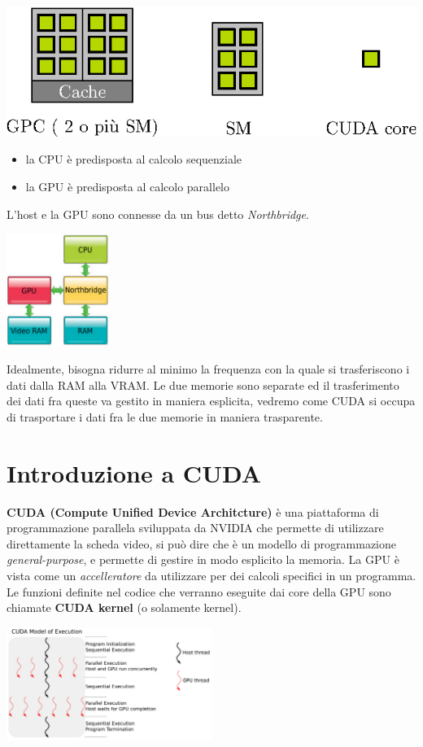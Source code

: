 \documentclass[10pt, letterpaper]{report}
\begin{document}
\begin{center}
    \includegraphics[width=\textwidth ]{images/SMblocchiCore2.eps}
\end{center}\begin{itemize}
    \item la CPU è predisposta al calcolo sequenziale 
    \item la GPU è predisposta al calcolo parallelo
\end{itemize}
L'host e la GPU sono connesse da un bus detto \textit{Northbridge}.\begin{center}
    \includegraphics[width=0.25\textwidth ]{images/GPUCPU.png}
\end{center}
Idealmente, bisogna ridurre al minimo la frequenza con la quale si trasferiscono i dati dalla RAM alla VRAM. Le due memorie sono separate ed il trasferimento dei dati fra queste va gestito in maniera esplicita, vedremo come CUDA  si occupa di trasportare i dati fra le due memorie in maniera trasparente.\flowerLine 
\section{Introduzione a CUDA}
\textbf{CUDA (Compute Unified Device Architcture)} è una piattaforma di programmazione parallela sviluppata da NVIDIA che permette di utilizzare direttamente la scheda video, si può dire che è un modello di programmazione \textit{general-purpose}, e permette di gestire in modo esplicito la memoria. La GPU è vista come un \textit{accelleratore} da utilizzare per dei calcoli specifici in un programma. 
Le funzioni definite nel codice che verranno eseguite dai core della GPU sono chiamate \textbf{CUDA kernel} (o solamente kernel).\begin{center}
    \includegraphics[width=0.5\textwidth ]{images/CUDAmodel.png}
\end{center}
\end{document}
